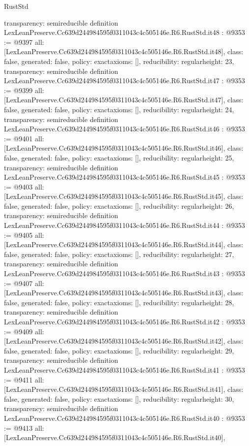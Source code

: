 \begin{lexlean}{RustStd}
\begin{coremodule}
{  transparency: semireducible
}
definition LexLeanPreserve.Cc639d244984595f0311043c4c505146e.R6.RustStd.it48 : @9353 := @9397 {
  all: [LexLeanPreserve.Cc639d244984595f0311043c4c505146e.R6.RustStd.it48],
  class: false,
  generated: false,
  policy: exact{axioms: []},
  reducibility: regular{height: 23},
  transparency: semireducible
}
definition LexLeanPreserve.Cc639d244984595f0311043c4c505146e.R6.RustStd.it47 : @9353 := @9399 {
  all: [LexLeanPreserve.Cc639d244984595f0311043c4c505146e.R6.RustStd.it47],
  class: false,
  generated: false,
  policy: exact{axioms: []},
  reducibility: regular{height: 24},
  transparency: semireducible
}
definition LexLeanPreserve.Cc639d244984595f0311043c4c505146e.R6.RustStd.it46 : @9353 := @9401 {
  all: [LexLeanPreserve.Cc639d244984595f0311043c4c505146e.R6.RustStd.it46],
  class: false,
  generated: false,
  policy: exact{axioms: []},
  reducibility: regular{height: 25},
  transparency: semireducible
}
definition LexLeanPreserve.Cc639d244984595f0311043c4c505146e.R6.RustStd.it45 : @9353 := @9403 {
  all: [LexLeanPreserve.Cc639d244984595f0311043c4c505146e.R6.RustStd.it45],
  class: false,
  generated: false,
  policy: exact{axioms: []},
  reducibility: regular{height: 26},
  transparency: semireducible
}
definition LexLeanPreserve.Cc639d244984595f0311043c4c505146e.R6.RustStd.it44 : @9353 := @9405 {
  all: [LexLeanPreserve.Cc639d244984595f0311043c4c505146e.R6.RustStd.it44],
  class: false,
  generated: false,
  policy: exact{axioms: []},
  reducibility: regular{height: 27},
  transparency: semireducible
}
definition LexLeanPreserve.Cc639d244984595f0311043c4c505146e.R6.RustStd.it43 : @9353 := @9407 {
  all: [LexLeanPreserve.Cc639d244984595f0311043c4c505146e.R6.RustStd.it43],
  class: false,
  generated: false,
  policy: exact{axioms: []},
  reducibility: regular{height: 28},
  transparency: semireducible
}
definition LexLeanPreserve.Cc639d244984595f0311043c4c505146e.R6.RustStd.it42 : @9353 := @9409 {
  all: [LexLeanPreserve.Cc639d244984595f0311043c4c505146e.R6.RustStd.it42],
  class: false,
  generated: false,
  policy: exact{axioms: []},
  reducibility: regular{height: 29},
  transparency: semireducible
}
definition LexLeanPreserve.Cc639d244984595f0311043c4c505146e.R6.RustStd.it41 : @9353 := @9411 {
  all: [LexLeanPreserve.Cc639d244984595f0311043c4c505146e.R6.RustStd.it41],
  class: false,
  generated: false,
  policy: exact{axioms: []},
  reducibility: regular{height: 30},
  transparency: semireducible
}
definition LexLeanPreserve.Cc639d244984595f0311043c4c505146e.R6.RustStd.it40 : @9353 := @9413 {
  all: [LexLeanPreserve.Cc639d244984595f0311043c4c505146e.R6.RustStd.it40],
}
\end{coremodule}
\end{lexlean}

